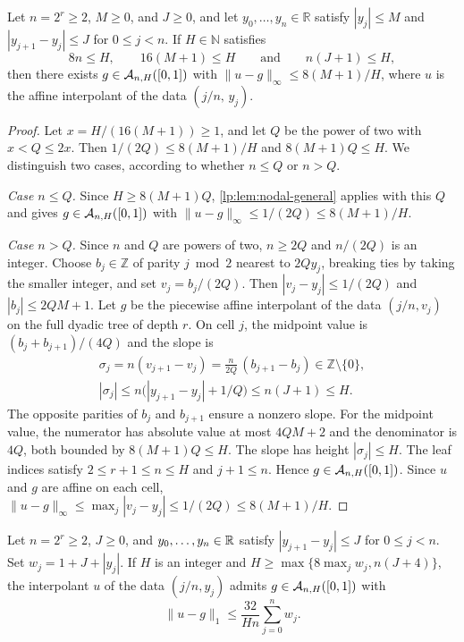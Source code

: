 \documentclass[11pt,a4paper]{article}
\begin{document}
\begin{lema}
\label{lp:lem:nodal-jump}
Let $n=2^r\ge2$, $M\ge0$, and $J\ge0$, and let $y_0,\dots,y_n\in\mathbb R$ satisfy $|y_j|\le M$ and $|y_{j+1}-y_j|\le J$ for $0\le j<n$. If $H\in\mathbb N$ satisfies
\[
 8n\le H,\qquad 16(M+1)\le H\qquad\text{and}\qquad n(J+1)\le H,
\]
then there exists $g\in\mathcal A_{n,H}([0,1])$ with $\|u-g\|_\infty\le 8(M+1)/H$, where $u$ is the affine interpolant of the data $(j/n,\,y_j)$.
\end{lema}

\begin{proof}
Let $x=H/(16(M+1))\ge1$, and let $Q$ be the power of two with $x<Q\le2x$. Then $1/(2Q)\le8(M+1)/H$ and $8(M+1)Q\le H$. We distinguish two cases, according to whether $n\le Q$ or $n>Q$.

\emph{Case $n\le Q$.} Since $H\ge8(M+1)Q$, \cref{lp:lem:nodal-general} applies with this $Q$ and gives $g\in\mathcal A_{n,H}([0,1])$ with $\|u-g\|_\infty\le1/(2Q)\le8(M+1)/H$.

\emph{Case $n>Q$.} Since $n$ and $Q$ are powers of two, $n\ge2Q$ and $n/(2Q)$ is an integer. Choose $b_j\in\mathbb Z$ of parity $j\bmod2$ nearest to $2Qy_j$, breaking ties by taking the smaller integer, and set $v_j=b_j/(2Q)$. Then $|v_j-y_j|\le1/(2Q)$ and $|b_j|\le2QM+1$. Let $g$ be the piecewise affine interpolant of the data $(j/n,v_j)$ on the full dyadic tree of depth $r$. On cell $j$, the midpoint value is $(b_j+b_{j+1})/(4Q)$ and the slope is
\begin{gather*}
 \sigma_j=n(v_{j+1}-v_j)=\frac{n}{2Q}\,(b_{j+1}-b_j)\in\mathbb Z\setminus\{0\},\\
 |\sigma_j|\le n\bigl(|y_{j+1}-y_j|+1/Q\bigr)\le n(J+1)\le H.
\end{gather*}
The opposite parities of $b_j$ and $b_{j+1}$ ensure a nonzero slope. For the midpoint value, the numerator has absolute value at most $4QM+2$ and the denominator is $4Q$, both bounded by $8(M+1)Q\le H$. The slope has height $|\sigma_j|\le H$. The leaf indices satisfy $2\le r+1\le n\le H$ and $j+1\le n$. Hence $g\in\mathcal A_{n,H}([0,1])$. Since $u$ and $g$ are affine on each cell, $\|u-g\|_\infty\le\max_j|v_j-y_j|\le1/(2Q)\le8(M+1)/H$.
\end{proof}

\begin{lema}
\label{lp:lem:nodal-variable-height}
Let $n=2^r\ge2$, $J\ge0$, and $y_0,\ldots,y_n\in\mathbb R$ satisfy $|y_{j+1}-y_j|\le J$ for $0\le j<n$. Set $w_j=1+J+|y_j|$. If $H$ is an integer and $H\ge\max\{8\max_j w_j,n(J+4)\}$, the interpolant $u$ of the data $(j/n,y_j)$ admits $g\in\mathcal A_{n,H}([0,1])$ with
\[
 \|u-g\|_1\le\frac{32}{Hn}\sum_{j=0}^n w_j .
\]
\end{lema}
\end{document}
